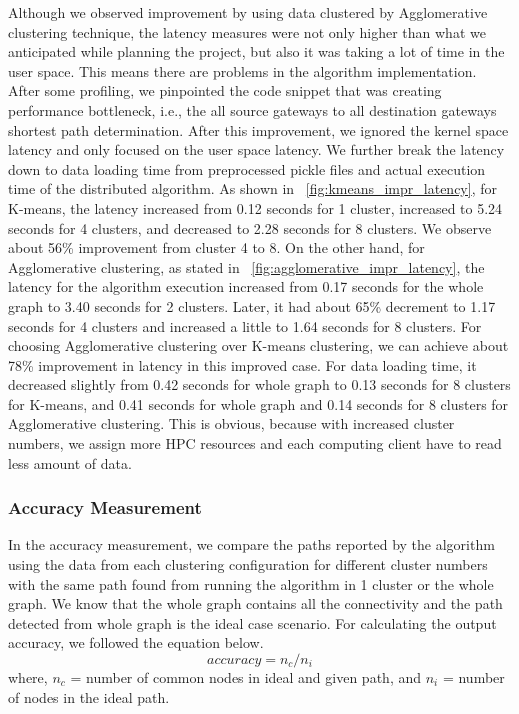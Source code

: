 Although we observed improvement by using data clustered by Agglomerative clustering technique, the latency measures were not only
higher than what we anticipated while planning the project, but also it was taking a lot of time in the user space. This means
there are problems in the algorithm implementation. After some profiling, we pinpointed the code snippet that was
creating performance bottleneck, i.e., the all source gateways to all destination gateways shortest path determination.
After this improvement, we ignored the kernel space latency and only focused on the user space latency. We further break the
latency down to data loading time from preprocessed pickle files and actual execution time of the distributed algorithm.
As shown in \figurename~\ref{fig:kmeans_impr_latency}, for K-means, the latency increased from 0.12 seconds for 1 cluster,
increased to 5.24 seconds for 4 clusters, and decreased to 2.28 seconds for 8 clusters. We observe about 56\% improvement
from cluster 4 to 8. On the other hand, for Agglomerative clustering, as stated in \figurename~\ref{fig:agglomerative_impr_latency},
the latency for the algorithm execution increased from 0.17 seconds for the whole graph to 3.40 seconds for 2 clusters.
Later, it had about 65\% decrement to 1.17 seconds for 4 clusters and increased a little to 1.64 seconds for 8 clusters.
For choosing Agglomerative clustering over K-means clustering, we can achieve about 78\% improvement in latency in this improved case.
For data loading time, it decreased slightly from 0.42 seconds for whole graph to 0.13 seconds for 8 clusters for K-means,
and 0.41 seconds for whole graph and 0.14 seconds for 8 clusters for Agglomerative clustering. This is obvious, because
with increased cluster numbers, we assign more HPC resources and each computing client have to read less amount of data.

\subsubsection{Accuracy Measurement}
\label{sec:accuracy_eval}
In the accuracy measurement, we compare the paths reported by the algorithm using the data from each clustering configuration
for different cluster numbers with the same path found from running the algorithm in 1 cluster or the whole graph.
We know that the whole graph contains all the connectivity and the path detected from whole graph is the ideal case scenario.
For calculating the output accuracy, we followed the equation below.
\[accuracy = n_c / n_i\]
where, $n_c$ = number of common nodes in ideal and given path, and $n_i$ = number of nodes in the ideal path.

